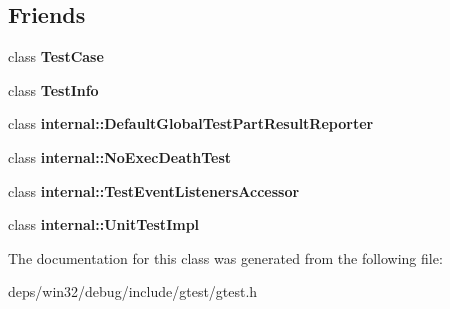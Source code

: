 \subsection*{Friends}
\begin{DoxyCompactItemize}
\item 
\hypertarget{classtesting_1_1_test_event_listeners_a61fe0349d692eb6d4f5b94e35049b2e9}{}class {\bfseries Test\+Case}\label{classtesting_1_1_test_event_listeners_a61fe0349d692eb6d4f5b94e35049b2e9}

\item 
\hypertarget{classtesting_1_1_test_event_listeners_aed3c96e2bd5a46339c1cbe49a4a233ee}{}class {\bfseries Test\+Info}\label{classtesting_1_1_test_event_listeners_aed3c96e2bd5a46339c1cbe49a4a233ee}

\item 
\hypertarget{classtesting_1_1_test_event_listeners_ac731f0389a3fc3cae64a80a5e53acc2a}{}class {\bfseries internal\+::\+Default\+Global\+Test\+Part\+Result\+Reporter}\label{classtesting_1_1_test_event_listeners_ac731f0389a3fc3cae64a80a5e53acc2a}

\item 
\hypertarget{classtesting_1_1_test_event_listeners_a6a1fde70fe3144b5b2b8f68a131a171f}{}class {\bfseries internal\+::\+No\+Exec\+Death\+Test}\label{classtesting_1_1_test_event_listeners_a6a1fde70fe3144b5b2b8f68a131a171f}

\item 
\hypertarget{classtesting_1_1_test_event_listeners_aab870c143f007b57c30389c7d5a84ea3}{}class {\bfseries internal\+::\+Test\+Event\+Listeners\+Accessor}\label{classtesting_1_1_test_event_listeners_aab870c143f007b57c30389c7d5a84ea3}

\item 
\hypertarget{classtesting_1_1_test_event_listeners_aa684cc13a8f91b00c0c9ce41ec7474eb}{}class {\bfseries internal\+::\+Unit\+Test\+Impl}\label{classtesting_1_1_test_event_listeners_aa684cc13a8f91b00c0c9ce41ec7474eb}

\end{DoxyCompactItemize}


The documentation for this class was generated from the following file\+:\begin{DoxyCompactItemize}
\item 
deps/win32/debug/include/gtest/gtest.\+h\end{DoxyCompactItemize}
